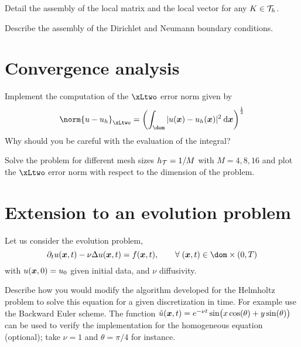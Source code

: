 \documentclass[assignment]{tmanotes}
\begin{document}
\medskip
\begin{tmatsks}
\item Detail the assembly of the local matrix and the local vector for any $K\in{\mathcal T}_h$.
\item Describe the assembly of the Dirichlet and Neumann boundary conditions.
\end{tmatsks}

\section{Convergence analysis}

\medskip
\begin{tmatsks}
\item Implement the computation of the $\xLtwo$ error norm given by
\[
\norm{u - u_h}_{\xLtwo} = \left(\int_{\dom} |u(\xx) - u_h(\xx)|^2 \md\xx\right)^\frac{1}{2}
\]
Why should you be careful with the evaluation of the integral?
\item Solve the problem for different mesh sizes $h_{\mathcal T} = 1/M$ with $M = 4,8,16$ and plot the $\xLtwo$ error norm with respect to the dimension of the problem.
\end{tmatsks}

\section{Extension to an evolution problem}

Let us consider the evolution problem,
\begin{equation}\label{eq:heat_equation}
\partial_t u(\xx,t) - \nu\Delta u(\xx,t) = f(\xx,t), \qquad \forany (\xx,t)\in\dom\times(0,T)
\end{equation}
with $u({{\boldsymbol x}}, 0) = u_0$ given initial data, and $\nu$ diffusivity.


\medskip
\begin{tmatsks}
\item Describe how you would modify the algorithm developed for the Helmholtz problem to solve this equation for a given discretization in time. For example use the Backward Euler scheme. The function $\tilde u({{\boldsymbol x}},t) = e^{-\nu t} \sin\bigl(x \cos(\theta) + y\sin(\theta)\bigr)$ can be used to verify the implementation for the homogeneous equation (optional); take $\nu = 1$ and $\theta = \pi/4$ for instance.
\end{tmatsks}
\end{document}
